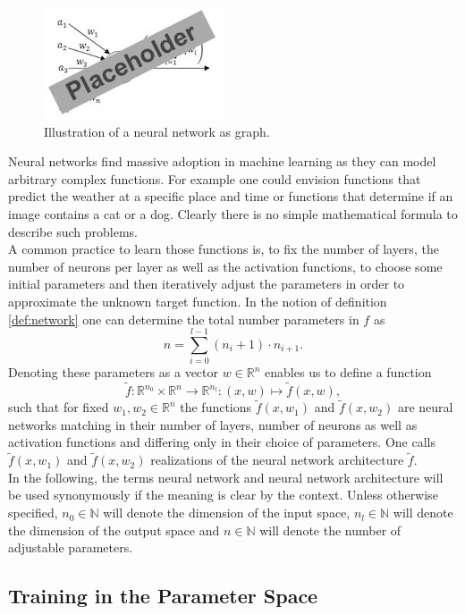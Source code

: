 \documentclass[11pt, a4paper]{article}
\newcommand{\N}{\mathbb{N}}
\newcommand{\R}{\mathbb{R}}
\begin{document}
\begin{figure}[!h]
\centering
\includegraphics{images/neuron.png}
\caption{Illustration of a neural network as graph.}
\label{fig:neuron}
\end{figure}  

Neural networks find massive adoption in machine learning as they can model arbitrary complex functions. For example one could envision functions that predict the weather at a specific place and time or functions that determine if an image contains a cat or a dog. Clearly there is no simple mathematical formula to describe such problems. \\

A common practice to learn those functions is, to fix the number of layers, the number of neurons per layer as well as the activation functions, to choose some initial parameters and then iteratively adjust the parameters in order to approximate the unknown target function. In the notion of definition \ref{def:network} one can determine the total number parameters in $f$ as
\[ n = \sum_{i=0}^{l-1} (n_i + 1) \cdot n_{i+1}. \]
Denoting these parameters as a vector $w \in \R^n$ enables us to define a function
\[ \tilde{f} : \R^{n_0} \times \R^n \to \R^{n_l} : (x,w) \mapsto \tilde{f}(x,w), \]
such that for fixed $w_1, w_2 \in \R^n$ the functions $\tilde{f}(x,w_1)$ and $\tilde{f}(x,w_2)$ are neural networks matching in their number of layers, number of neurons as well as activation functions and differing only in their choice of parameters. One calls $\tilde{f}(x,w_1)$ and $\tilde{f}(x,w_2)$ realizations of the neural network architecture $\tilde{f}$. \\

In the following, the terms neural network and neural network architecture will be used synonymously if the meaning is clear by the context. Unless otherwise specified, $n_0 \in \N$ will denote the dimension of the input space, $n_l \in \N$ will denote the dimension of the output space and $n \in \N$ will denote the number of adjustable parameters.

\subsection{Training in the Parameter Space}\label{sec:Training}
\end{document}
